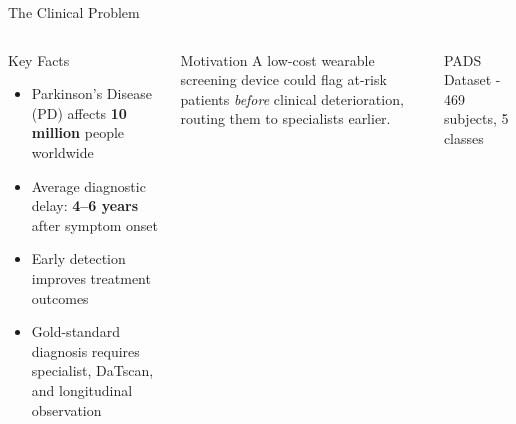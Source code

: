 \documentclass[aspectratio=169, 11pt]{beamer}
\begin{document}
\begin{frame}{The Clinical Problem}
  \begin{columns}[T]
      \begin{alertblock}{Key Facts}
        \small                          %
        \begin{itemize}
          \item Parkinson's Disease (PD) affects \textbf{10 million} people worldwide
          \item Average diagnostic delay: \textbf{4--6 years} after symptom onset
          \item Early detection improves treatment outcomes
          \item Gold-standard diagnosis requires specialist, DaTscan, and longitudinal observation
        \end{itemize}
      \end{alertblock}
      \vspace{0.3em}
      \begin{block}{Motivation}
        \small
        A low-cost wearable screening device could flag at-risk patients
        \emph{before} clinical deterioration, routing them to specialists earlier.
      \end{block}
      \vspace{0.1em}
      {\tiny PADS Dataset - 469 subjects, 5 classes}
  \end{columns}
\end{frame}
\end{document}
